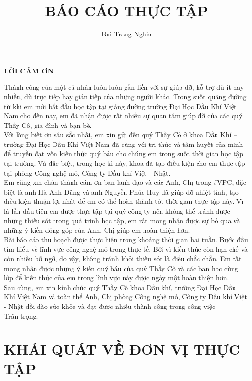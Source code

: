 \documentclass[12pt,a4paper]{report}
\title{\textbf{BÁO CÁO THỰC TẬP}}
\author{Bui Trong Nghia}
\begin{document}
\thispagestyle{empty}
\clearpage


\maketitle
\newpage

\begin{center}
	\centering
    \textbf{LỜI CẢM ƠN}
\end{center}
Thành công của một cá nhân luôn luôn gắn liền với sự giúp đỡ, hỗ trợ dù ít hay nhiều, dù trực tiếp hay gián tiếp của những người khác. Trong suốt quãng đường từ khi em mới bắt đầu học tập tại giảng đường trường Đại Học Dầu Khí Việt Nam cho đến nay, em đã nhận được rất nhiều sự quan tâm giúp đỡ của các quý Thầy Cô, gia đình và bạn bè.\\
Với lòng biết ơn sâu sắc nhất, em xin gửi đến quý Thầy Cô ở khoa Dầu Khí – trường Đại Học Dầu Khí Việt Nam đã cùng với tri thức và tâm huyết của mình để truyền đạt vốn kiến thức quý báu cho chúng em trong suốt thời gian học tập tại trường. Và đặc biệt, trong học kì này, khoa đã tạo điều kiện cho em thực tập tại phòng Công nghệ mỏ, Công ty Dầu khí Việt - Nhật.\\
Em cũng xin chân thành cám ơn ban lãnh đạo và các Anh, Chị trong JVPC, đặc biệt là anh Hà Anh Dũng và anh Nguyễn Phúc Huy đã giúp đỡ nhiệt tình, tạo điều kiện thuận lợi nhất để em có thể hoàn thành tốt thời gian thực tập này. Vì là lần đầu tiên em được thực tập tại quý công ty nên không thể tránh được những thiếu sót trong quá trình học tập, em rất mong nhận được sự bỏ qua và những ý kiến đóng góp của Anh, Chị giúp em hoàn thiện hơn.\\
Bài báo cáo thu hoạch được thực hiện trong khoảng thời gian hai tuần. Bước đầu tìm hiểu về lĩnh vực công nghệ mỏ trong thực tế. Bởi vì kiến thức còn hạn chế và còn nhiều bỡ ngỡ, do vậy, không tránh khỏi thiếu sót là điều chắc chắn. Em rất mong nhận được những ý kiến quý báu của quý Thầy Cô và các bạn học cùng lớp để kiến thức của em trong lĩnh vực này được ngày một hoàn thiện hơn.\\
Sau cùng, em xin kính chúc quý Thầy Cô khoa Dầu khí, trường Đại Học Dầu Khí Việt Nam và toàn thể Anh, Chị phòng Công nghệ mỏ, Công ty Dầu khí Việt - Nhật dồi dào sức khỏe và đạt được nhiều thành công trong công việc.\\
Trân trọng.

\newpage
\tableofcontents
\listoffigures
\clearpage
{}
\newpage
\chapter{KHÁI QUÁT VỀ ĐƠN VỊ THỰC TẬP}
\end{document}
